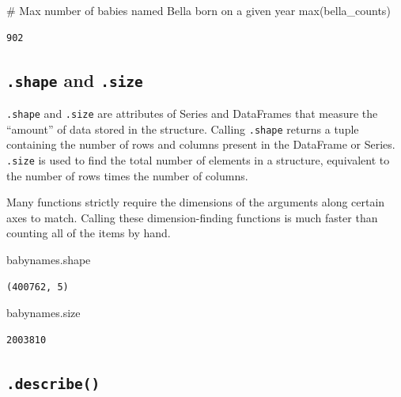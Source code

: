 \documentclass[
  letterpaper,
  DIV=11,
  numbers=noendperiod]{scrreprt}
\newenvironment{Shaded}{\begin{snugshade}}{\end{snugshade}}
\newcommand{\BuiltInTok}[1]{\textcolor[rgb]{0.00,0.23,0.31}{#1}}
\newcommand{\CommentTok}[1]{\textcolor[rgb]{0.37,0.37,0.37}{#1}}
\newcommand{\NormalTok}[1]{\textcolor[rgb]{0.00,0.23,0.31}{#1}}
\begin{document}
\begin{Shaded}
\begin{Highlighting}[]
\CommentTok{\# Max number of babies named Bella born on a given year}
\BuiltInTok{max}\NormalTok{(bella\_counts)}
\end{Highlighting}
\end{Shaded}

\begin{verbatim}
902
\end{verbatim}

\hypertarget{shape-and-.size}{%
\subsection{\texorpdfstring{\texttt{.shape} and
\texttt{.size}}{.shape and .size}}\label{shape-and-.size}}

\texttt{.shape} and \texttt{.size} are attributes of Series and
DataFrames that measure the ``amount'' of data stored in the structure.
Calling \texttt{.shape} returns a tuple containing the number of rows
and columns present in the DataFrame or Series. \texttt{.size} is used
to find the total number of elements in a structure, equivalent to the
number of rows times the number of columns.

Many functions strictly require the dimensions of the arguments along
certain axes to match. Calling these dimension-finding functions is much
faster than counting all of the items by hand.

\begin{Shaded}
\begin{Highlighting}[]
\NormalTok{babynames.shape}
\end{Highlighting}
\end{Shaded}

\begin{verbatim}
(400762, 5)
\end{verbatim}

\begin{Shaded}
\begin{Highlighting}[]
\NormalTok{babynames.size}
\end{Highlighting}
\end{Shaded}

\begin{verbatim}
2003810
\end{verbatim}

\hypertarget{describe}{%
\subsection{\texorpdfstring{\texttt{.describe()}}{.describe()}}\label{describe}}
\end{document}
